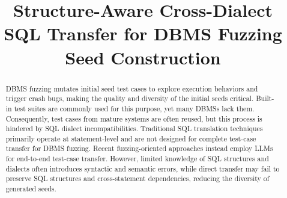 \documentclass[conference]{IEEEtran}
\begin{document}
\title{Structure-Aware Cross-Dialect SQL Transfer for DBMS Fuzzing Seed Construction}


\maketitle

\begin{abstract}

DBMS fuzzing mutates initial seed test cases to explore execution behaviors and trigger crash bugs, making the quality and diversity of the initial seeds critical.
Built-in test suites are commonly used for this purpose, yet many DBMSs lack them.
Consequently, test cases from mature systems are often reused, but this process is hindered by SQL dialect incompatibilities.
Traditional SQL translation techniques primarily operate at statement-level and are not designed for complete test-case transfer for DBMS fuzzing.
Recent fuzzing-oriented approaches instead employ LLMs for end-to-end test-case transfer.
However, limited knowledge of SQL structures and dialects often introduces syntactic and semantic errors, while direct transfer may fail to preserve SQL structures and cross-statement dependencies, reducing the diversity of generated seeds.


\end{abstract}
\end{document}
